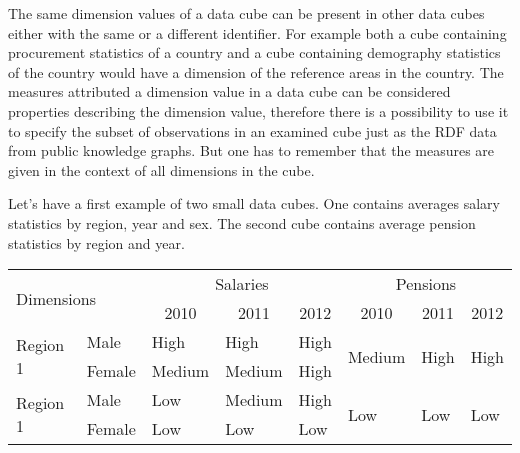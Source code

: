 The same dimension values of a data cube can be present in other data cubes either with the same or a different identifier. For example both a cube containing procurement statistics of a country and a cube containing demography statistics of the country would have a dimension of the reference areas in the country. The measures attributed a dimension value in a data cube can be considered properties describing the dimension value, therefore there is a possibility to use it to specify the subset of observations in an examined cube just as the RDF data from public knowledge graphs. But one has to remember that the measures are given in the context of all dimensions in the cube. 

Let's have a first example of two small data cubes. One contains averages salary statistics by region, year and sex. The second cube contains average pension statistics by region and year.

\begin{table}[h]
\centering
\begin{tabular}{ll|lll|lll}
\multicolumn{2}{l|}{\multirow{2}{*}{Dimensions}} & \multicolumn{3}{c|}{Salaries}                                                   & \multicolumn{3}{c}{Pensions}                                                    \\
\multicolumn{2}{l|}{}                            & \multicolumn{1}{c}{2010} & \multicolumn{1}{c}{2011} & \multicolumn{1}{c|}{2012} & \multicolumn{1}{c}{2010} & \multicolumn{1}{c}{2011} & \multicolumn{1}{c}{2012}  \\ 
\hline
\multirow{2}{*}{Region 1} & Male                 & High                     & High                     & High                      & \multirow{2}{*}{Medium}  & \multirow{2}{*}{High}    & \multirow{2}{*}{High}     \\
                          & Female               & Medium                   & Medium                   & High                     &                          &                          &                           \\
\multirow{2}{*}{Region 1} & Male                 & Low                      & Medium                   & High                      & \multirow{2}{*}{Low}     & \multirow{2}{*}{Low}     & \multirow{2}{*}{Low}      \\
                          & Female               & Low                      & Low                      & Low                       &                          &                          &                          
\end{tabular}
\end{table}

